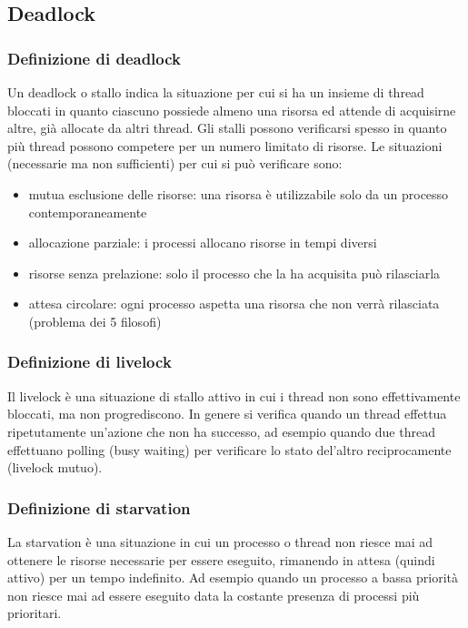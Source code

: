 \documentclass[a4paper]{article}
\begin{document}
\newpage


\subsection{Deadlock}
\subsubsection*{Definizione di deadlock}
Un deadlock o stallo indica la situazione per cui si ha un insieme di thread bloccati in quanto ciascuno possiede almeno una
risorsa ed attende di acquisirne altre, già allocate da altri thread. Gli stalli possono verificarsi spesso in quanto più thread
possono competere per un numero limitato di risorse. Le situazioni (necessarie ma non sufficienti) per cui si può verificare sono:
\begin{itemize}
	\item mutua esclusione delle risorse: una risorsa è utilizzabile solo da un processo contemporaneamente
	\item allocazione parziale: i processi allocano risorse in tempi diversi
	\item risorse senza prelazione: solo il processo che la ha acquisita può rilasciarla
	\item attesa circolare: ogni processo aspetta una risorsa che non verrà rilasciata (problema dei 5 filosofi)
\end{itemize}

\subsubsection*{Definizione di livelock}
Il livelock è una situazione di stallo attivo in cui i thread non sono effettivamente bloccati, ma non progrediscono. In genere
si verifica quando un thread effettua ripetutamente un'azione che non ha successo, ad esempio quando due thread effettuano polling
(busy waiting) per verificare lo stato del'altro reciprocamente (livelock mutuo).

\subsubsection*{Definizione di starvation}
La starvation è una situazione in cui un processo o thread non riesce mai ad ottenere le risorse necessarie per essere eseguito,
rimanendo in attesa (quindi attivo) per un tempo indefinito. Ad esempio quando un processo a bassa priorità non riesce mai ad
essere eseguito data la costante presenza di processi più prioritari.
\end{document}
